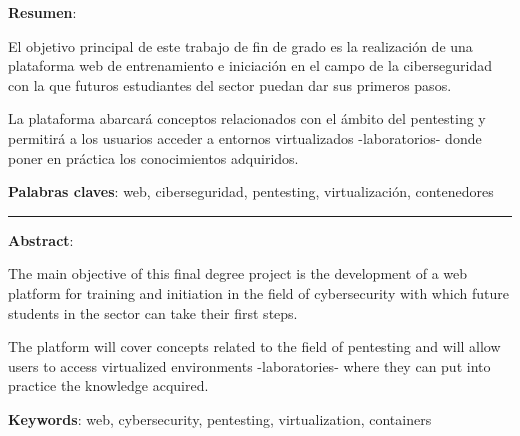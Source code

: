 \textbf{Resumen}:

El objetivo principal de este trabajo de fin de grado es la realización de una plataforma web de entrenamiento e iniciación en el campo de la ciberseguridad con la que futuros estudiantes del sector puedan dar sus primeros pasos.

La plataforma abarcará conceptos relacionados con el ámbito del pentesting y permitirá a los usuarios acceder a entornos virtualizados -laboratorios- donde poner en práctica los conocimientos adquiridos.

\vspace{1cm}

\textbf{Palabras claves}: web, ciberseguridad, pentesting, virtualización, contenedores


\vspace{1cm}

\begin{center}

    \rule{0.5\textwidth}{0.5 pt}

\end{center}

\vspace{1cm}


\textbf{Abstract}:

The main objective of this final degree project is the development of a web platform for training and initiation in the field of cybersecurity with which future students in the sector can take their first steps.

The platform will cover concepts related to the field of pentesting and will allow users to access virtualized environments -laboratories- where they can put into practice the knowledge acquired.

\vspace{1cm}

\textbf{Keywords}: web, cybersecurity, pentesting, virtualization, containers
